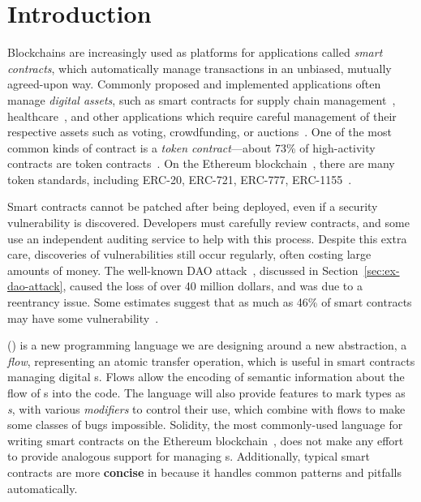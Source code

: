 \documentclass[dvipsnames, usenames, sigconf]{acmart}
\begin{document}

\maketitle

\section{Introduction}

Blockchains are increasingly used as platforms for applications called \emph{smart contracts}, which automatically manage transactions in an unbiased, mutually agreed-upon way.
Commonly proposed and implemented applications often manage \emph{digital assets}, such as smart contracts for supply chain management~\cite{SupplyChainUse}, healthcare~\cite{HealthcareUse}, and other applications which require careful management of their respective assets such as voting, crowdfunding, or auctions~\cite{Elsden18:Making}.
One of the most common kinds of contract is a \emph{token contract}---about 73\% of high-activity contracts are token contracts~\cite{OlivaEtAl2019}.
On the Ethereum blockchain~\cite{wood2014ethereum}, there are many token standards, including ERC-20, ERC-721, ERC-777, ERC-1155~\cite{erc20,erc721,erc777,erc1155}.

Smart contracts cannot be patched after being deployed, even if a security vulnerability is discovered.
Developers must carefully review contracts, and some use an independent auditing service to help with this process.
Despite this extra care, discoveries of vulnerabilities still occur regularly, often costing large amounts of money.
The well-known DAO attack~\cite{DAO}, discussed in Section~\ref{sec:ex-dao-attack}, caused the loss of over 40 million dollars, and was due to a reentrancy issue.
Some estimates suggest that as much as 46\% of smart contracts may have some vulnerability~\cite{luuOyente}.

\langName (\langNamePronounce) is a new programming language we are designing around a new abstraction, a \emph{flow}, representing an atomic transfer operation, which is useful in smart contracts managing digital \assetTxt{}s.
Flows allow the encoding of semantic information about the flow of \assetTxt{}s into the code.
The \langName language will also provide features to mark types as \emph{\assetTxt{}s}, with various \emph{modifiers} to control their use, which combine with flows to make some classes of bugs impossible.
Solidity, the most commonly-used language for writing smart contracts on the Ethereum blockchain~\cite{EthereumForDevs}, does not make any effort to provide analogous support for managing \assetTxt{}s.
Additionally, typical smart contracts are more \textbf{concise} in \langName because it handles common patterns and pitfalls automatically.
\end{document}
